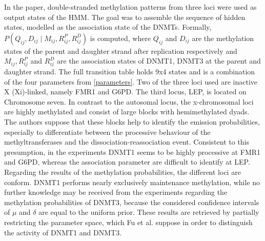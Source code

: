 In the paper, double-stranded methylation patterns from three loci were used as output states of the \ac{HMM}. The goal was to assemble the sequence of hidden states, modelled as the association state of the \acp{DNMT}. Formally, $P(Q_{ij},D_{ij}\mid M_{ij},R_{ij}^P,R_{ij}^D)$ is computed, where $Q_{ij}$ and $D_{ij}$ are the methylation states of the parent and daughter strand after replication respectively and  $M_{ij},R_{ij}^P$ and $R_{ij}^D$ are the association states of DNMT1, DNMT3 at the parent and daughter strand. The full transition table holds 9x4 states and is a combination of the four parameters from \ref{parameters}.\newline
Two of the three loci used are inactive X (Xi)-linked, namely FMR1 and G6PD. The third locus, LEP, is located on Chromosome seven. In contrast to the autosomal locus, the x-chromosomal loci are highly methylated and consist of large blocks with hemimethylated dyads. The authors suppose that these blocks help to identify the emission probabilities, especially to differentiate between the processive behaviour of the methyltransferases and the dissociation-reassociation event. Consistent to this presumption, in the experiments DNMT1 seems to be highly processive at FMR1 and G6PD, whereas the association parameter are difficult to identify at LEP. Regarding the results of the methylation probabilities, the different loci are conform. DNMT1 performs nearly exclusively maintenance methylation, while no further knowledge may be received from the experiments regarding the methylation probabilities of DNMT3, because the considered confidence intervals of $\mu$ and $\delta$ are equal to the uniform prior. These results are retrieved by partially restricting the parameter space, which Fu et al. suppose in order to distinguish the activity of DNMT1 and DNMT3.\\

